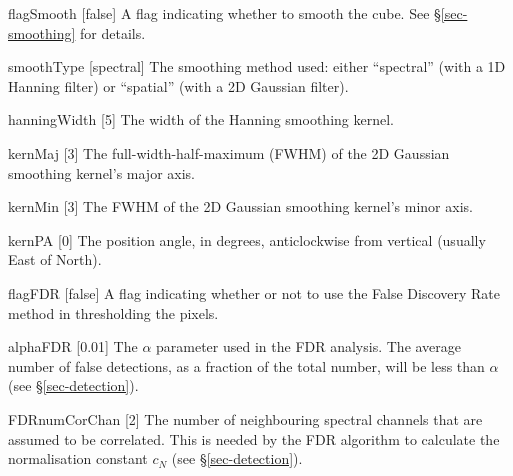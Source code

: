 \begin{Lentry}
\item[{flagSmooth [false]}] A flag indicating whether to
  smooth the cube. See \S\ref{sec-smoothing} for details. 
\item[{smoothType [spectral]}] The smoothing method used: either
  ``spectral'' (with a 1D Hanning filter) or ``spatial'' (with a 2D
  Gaussian filter).  
\item[{hanningWidth [5]}] The width of the Hanning smoothing
  kernel.
\item[{kernMaj [3]}] The full-width-half-maximum (FWHM) of the
  2D Gaussian smoothing kernel's major axis.
\item[{kernMin [3]}] The FWHM of the 2D Gaussian smoothing kernel's
  minor axis.
\item[{kernPA [0]}] The position angle, in degrees,
  anticlockwise from vertical (\ie usually East of North). 
\end{Lentry}

\begin{Lentry}
\item[{flagFDR [false]}] A flag indicating whether or not to use
  the False Discovery Rate method in thresholding the pixels.
\item[{alphaFDR [0.01]}] The $\alpha$ parameter used in the FDR
  analysis. The average number of false detections, as a fraction of
  the total number, will be less than $\alpha$ (see
  \S\ref{sec-detection}).
\item[{FDRnumCorChan [2]}] The number of neighbouring spectral
  channels that are assumed to be correlated. This is needed by the
  FDR algorithm to calculate the normalisation constant $c_N$ (see
  \S\ref{sec-detection}). 
\end{Lentry}

